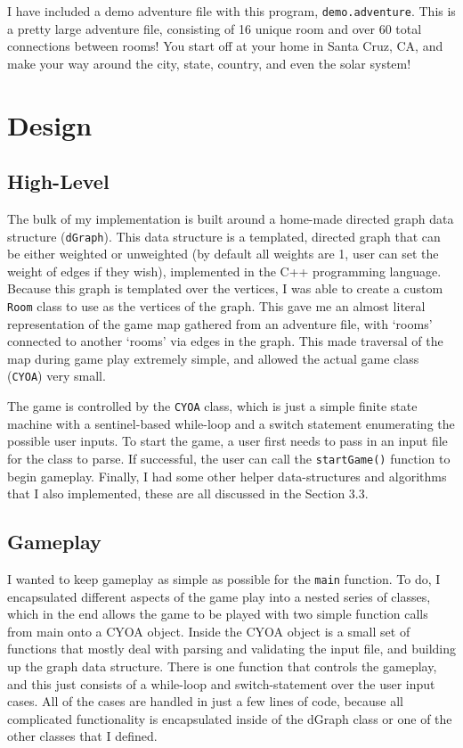 \documentclass[a4paper,11pt]{article}
\begin{document}
    I have included a demo adventure file with this program, \texttt{demo.adventure}. This is a pretty large adventure file, consisting of 16 unique room and over 60 total connections between rooms! You start off at your home in Santa Cruz, CA, and make your way around the city, state, country, and even the solar system! 



\section{Design}

    \subsection{High-Level}
    The bulk of my implementation is built around a home-made directed graph data structure (\texttt{dGraph}). This data structure is a templated, directed graph that can be either weighted or unweighted (by default all weights are 1, user can set the weight of edges if they wish), implemented in the C++ programming language. Because this graph is templated over the vertices, I was able to create a custom \texttt{Room} class to use as the vertices of the graph. This gave me an almost literal representation of the game map gathered from an adventure file, with `rooms' connected to another `rooms' via edges in the graph. This made traversal of the map during game play extremely simple, and allowed the actual game class (\texttt{CYOA}) very small. \par
    
    The game is controlled by the \texttt{CYOA} class, which is just a simple finite state machine with a sentinel-based while-loop and a switch statement enumerating the possible user inputs. To start the game, a user first needs to pass in an input file for the class to parse. If successful, the user can call the \texttt{startGame()} function to begin gameplay. Finally, I had some other helper data-structures and algorithms that I also implemented, these are all discussed in the Section 3.3.

    \subsection{Gameplay}
    I wanted to keep gameplay as simple as possible for the \texttt{main} function. To do, I encapsulated different aspects of the game play into a nested series of classes, which in the end allows the game to be played with two simple function calls from main onto a CYOA object. Inside the CYOA object is a small set of functions that mostly deal with parsing and validating the input file, and building up the graph data structure. There is one function that controls the gameplay, and this just consists of a while-loop and switch-statement over the user input cases. All of the cases are handled in just a few lines of code, because all complicated functionality is encapsulated inside of the dGraph class or one of the other classes that I defined.  
\end{document}
